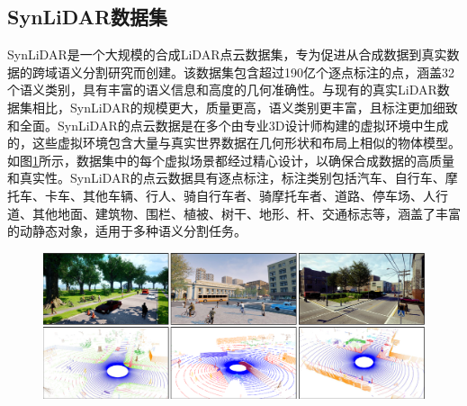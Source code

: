 \subsection{SynLiDAR数据集}
SynLiDAR是一个大规模的合成LiDAR点云数据集，专为促进从合成数据到真实数据的跨域语义分割研究而创建。该数据集包含超过190亿个逐点标注的点，涵盖32个语义类别，具有丰富的语义信息和高度的几何准确性。与现有的真实LiDAR数据集相比，SynLiDAR的规模更大，质量更高，语义类别更丰富，且标注更加细致和全面。SynLiDAR的点云数据是在多个由专业3D设计师构建的虚拟环境中生成的，这些虚拟环境包含大量与真实世界数据在几何形状和布局上相似的物体模型。如图\ref{fig:2-4}所示，数据集中的每个虚拟场景都经过精心设计，以确保合成数据的高质量和真实性。SynLiDAR的点云数据具有逐点标注，标注类别包括汽车、自行车、摩托车、卡车、其他车辆、行人、骑自行车者、骑摩托车者、道路、停车场、人行道、其他地面、建筑物、围栏、植被、树干、地形、杆、交通标志等，涵盖了丰富的动静态对象，适用于多种语义分割任务。
\vspace{-0.1cm}
\begin{figure}[h]
    \centering
    \includegraphics[width = 1\textwidth]{ljx/figure/2-5/synlidar.png}
    \label{fig:2-4}
\end{figure}
\vspace{-0.35cm} 
